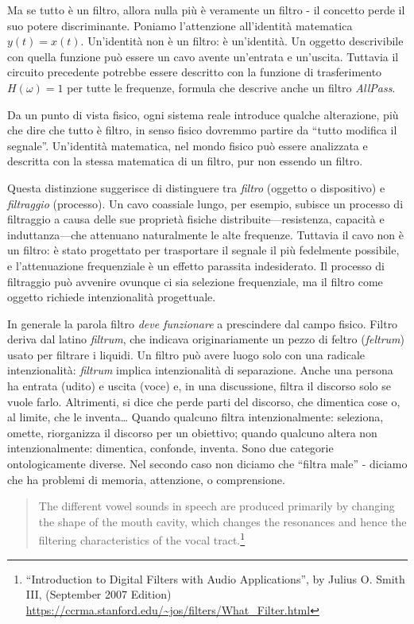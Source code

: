 Ma se tutto è un filtro, allora nulla più è veramente un filtro - il concetto
perde il suo potere discriminante. Poniamo l'attenzione all'identità matematica
$y(t)=x(t)$. Un'identità non è un filtro: è un'identità. Un oggetto descrivibile
con quella funzione può essere un cavo avente un'entrata e un'uscita. Tuttavia
il circuito precedente potrebbe essere descritto con la funzione di
trasferimento $H(\omega)=1$ per tutte le frequenze, formula che descrive anche
un filtro \emph{AllPass}.

Da un punto di vista fisico, ogni sistema reale introduce qualche alterazione,
più che dire che tutto è filtro, in senso fisico dovremmo partire da “tutto
modifica il segnale”. Un'identità matematica, nel mondo fisico può essere
analizzata e descritta con la stessa matematica di un filtro, pur non essendo un
filtro.

Questa distinzione suggerisce di distinguere tra \emph{filtro} (oggetto o
dispositivo) e \emph{filtraggio} (processo). Un cavo coassiale lungo, per
esempio, subisce un processo di filtraggio a causa delle sue proprietà fisiche
distribuite—resistenza, capacità e induttanza—che attenuano naturalmente le
alte frequenze. Tuttavia il cavo non è un filtro: è stato progettato per
trasportare il segnale il più fedelmente possibile, e l'attenuazione
frequenziale è un effetto parassita indesiderato. Il processo di filtraggio
può avvenire ovunque ci sia selezione frequenziale, ma il filtro come oggetto
richiede intenzionalità progettuale.

In generale la parola filtro \emph{deve funzionare} a prescindere dal campo
fisico. Filtro deriva dal latino \emph{filtrum}, che indicava originariamente un
pezzo di feltro (\emph{feltrum}) usato per filtrare i liquidi. Un filtro può
avere luogo solo con una radicale intenzionalità: \emph{filtrum} implica
intenzionalità di separazione. Anche una persona ha entrata (udito) e uscita
(voce) e, in una discussione, filtra il discorso solo se vuole farlo. Altrimenti,
si dice che perde parti del discorso, che dimentica cose o, al limite, che le inventa\ldots
Quando qualcuno filtra intenzionalmente: seleziona, omette, riorganizza il
discorso per un obiettivo; quando qualcuno altera non intenzionalmente:
dimentica, confonde, inventa. Sono due categorie ontologicamente diverse. Nel
secondo caso non diciamo che “filtra male” - diciamo che ha problemi di memoria,
attenzione, o comprensione.

\begin{quote}
  \begin{sf}
    \small
    The different vowel sounds in speech are produced primarily by changing the
    shape of the mouth cavity, which changes the resonances and hence the
    filtering characteristics of the vocal tract.\footnote{
    “Introduction to Digital Filters with Audio Applications”, by Julius O.
    Smith III, (September 2007 Edition)
    \url{https://ccrma.stanford.edu/~jos/filters/What_Filter.html}
    }
  \end{sf}
\end{quote}


